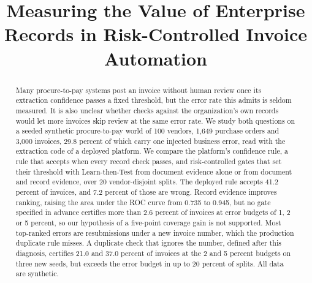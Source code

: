 \documentclass[conference]{IEEEtran}
\newif\ifanon
\begin{document}
\title{Measuring the Value of Enterprise Records in Risk-Controlled Invoice Automation}

\ifanon
\author{\IEEEauthorblockN{Anonymous Authors}
\IEEEauthorblockA{Affiliation withheld for double-blind review}}
\else
\author{
}
\fi

\maketitle

\begin{abstract}
Many procure-to-pay systems post an invoice without human review once its
extraction confidence passes a fixed threshold, but the error rate this admits is
seldom measured. It is also unclear whether checks against the organization's own
records would let more invoices skip review at the same error rate. We study both
questions on a seeded synthetic procure-to-pay world of 100 vendors, 1,649
purchase orders and 3,000 invoices, 29.8 percent of which carry one injected
business error, read with the extraction code of a deployed platform. We compare
the platform's confidence rule, a rule that accepts when every record check
passes, and risk-controlled gates that set their threshold with Learn-then-Test
from document evidence alone or from document and record evidence, over 20
vendor-disjoint splits. The deployed rule accepts 41.2 percent of invoices, and
7.2 percent of those are wrong. Record evidence improves ranking, raising the area
under the ROC curve from 0.735 to 0.945, but no gate specified in advance
certifies more than 2.6 percent of invoices at error budgets of 1, 2 or 5
percent, so our hypothesis of a five-point coverage gain is not supported. Most
top-ranked errors are resubmissions under a new invoice number, which the
production duplicate rule misses. A duplicate check that ignores the number,
defined after this diagnosis, certifies 21.0 and 37.0 percent of invoices at the 2
and 5 percent budgets on three new seeds, but exceeds the error budget in up to
20 percent of splits. All data are synthetic.
\end{abstract}
\end{document}
